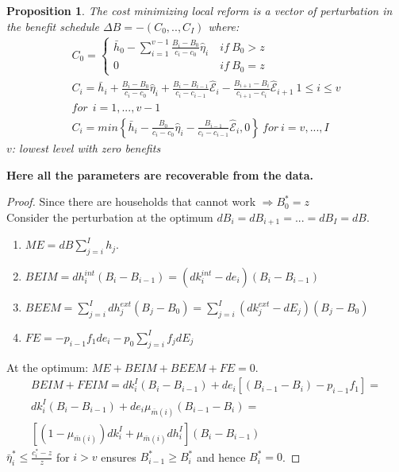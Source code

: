 \documentclass[xcolor=pdftex,dvipsnames,table]{beamer}
\newtheorem{prop}{Proposition}
\begin{document}
\begin{frame}[label=reform]
\begin{prop}
The cost minimizing local reform is a vector of perturbation in the benefit schedule $\Delta B = -(C_0,..,C_I)$ where:
	\begin{align*}				
	 C_0 =\begin{cases}\bar{h}_0-\sum_{i=1}^{v-1}\frac{B_i-B_0}{c_i-c_0}\hat{\eta}_i\ & if\ B_0>z\\
	 0\ & if\ B_0=z \end{cases}\\
	 C_i =\bar{h}_i+\frac{B_i-B_0}{c_i-c_0}\hat{\eta}_i+\frac{B_i-B_{i-1}}{c_i-c_{i-1}}\hat{\mathcal{E}}_i-\frac{B_{i+1}-B_{i}}{c_{i+1}-c_{i}}\hat{\mathcal{E}}_{i+1}\ 1\leq i\leq v\\ for\ \ i =1,...,v-1\\
	 C_{i} =min\left\{\bar{h}_{i}-\frac{B_0}{c_{i}-c_0}\hat{\eta}_{i}-\frac{B_{i-1}}{c_{i}-c_{i-1}}\hat{\mathcal{E}}_{i},0\right\}\ for\ i=v,...,I
	\end{align*}
	 $v$: lowest level with zero benefits
\end{prop}	
\begin{block}

\textbf{Here all the parameters are recoverable from the data.}
\end{block}
\hyperlink{implications}{}
\end{frame}

\begin{frame}[label=proof_main]
\begin{proof}
Since there are households that cannot work $\Rightarrow B_0^*=z$ \\
Consider the perturbation at the optimum $dB_i=dB_{i+1}=...=dB_I=dB$. \\
\begin{enumerate}
\item $ME =  dB\sum_{j=i}^Ih_j$.\\
\item $BEIM = dh^{int}_i(B_i-B_{i-1})= (dk^{int}_i-de_i)(B_i-B_{i-1})$\\
\item $BEEM = \sum_{j=i}^Idh^{ext}_j(B_j-B_0) =\sum_{j=i}^I(dk^{ext}_j-dE_j)(B_j-B_0) $\\
\item $FE =-p_{i-1}f_1de_i-p_{0}\sum_{j=i}^If_jdE_j$\\
\end{enumerate}
At the optimum: $ME + BEIM + BEEM +FE= 0$.
\begin{align*}
BEIM+FEIM=dk^I_i(B_i-B_{i-1})+de_i[(B_{i-1}-B_{i})-p_{i-1}f_1]=\\
dk^I_i(B_i-B_{i-1})+de_i\mu_{\bar{m}(i)}(B_{i-1}-B_{i})=\\
\left[(1-\mu_{\bar{m}(i)})dk^I_i+\mu_{\bar{m}(i)} dh_i^I\right](B_i-B_{i-1})
\end{align*} 
$\bar{\eta}^{*}_i\leq \frac{c^*_i-z}{z}$  for $i>v$ ensures  $B^*_{i-1}\geq B^*_i$ and hence $B^*_i=0$.
\end{proof}
\hyperlink{prop_imp}{}
\end{frame}
\end{document}
